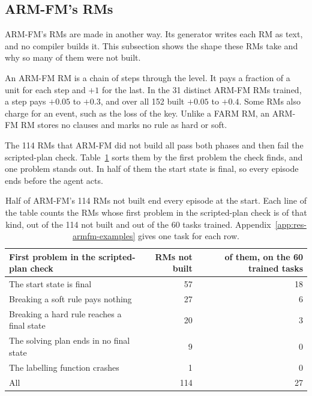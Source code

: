 \documentclass[11pt,english,listoffigures,listoftables]{tfgetsinf}
\newcommand{\gain}[1]{\textcolor{green!40!black}{\bfseries\boldmath #1}}  %
\begin{document}
\subsection{ARM-FM's RMs}
\label{sec:res-armfm-machines}

ARM-FM's RMs are made in another way. Its generator writes each RM as text, and no compiler builds it. This subsection shows the shape these RMs take and why so many of them were not built.

An ARM-FM RM is a chain of steps through the level. It pays a fraction of a unit for each step and \gain{$+1$} for the last. In the 31 distinct ARM-FM RMs trained, a step pays \gain{$+0.05$} to \gain{$+0.3$}, and over all 152 built \gain{$+0.05$} to \gain{$+0.4$}. Some RMs also charge for an event, such as the loss of the key. Unlike a FARM RM, an ARM-FM RM stores no clauses and marks no rule as hard or soft.

The 114 RMs that ARM-FM did not build all pass both phases and then fail the scripted-plan check. Table~\ref{tab:res-armfm-failures} sorts them by the first problem the check finds, and one problem stands out. In half of them the start state is final, so every episode ends before the agent acts.

\begin{table}[H]
\centering
\footnotesize
\renewcommand{\arraystretch}{1.2}
\begin{tabular}{@{}lrr@{}}
\toprule
\textbf{First problem in the scripted-plan check} & \textbf{RMs not built} & \textbf{of them, on the 60 trained tasks} \\ \midrule
The start state is final & 57 & 18 \\
Breaking a soft rule pays nothing & 27 & 6 \\
Breaking a hard rule reaches a final state & 20 & 3 \\
The solving plan ends in no final state & 9 & 0 \\
The labelling function crashes & 1 & 0 \\ \midrule
All & 114 & 27 \\ \bottomrule
\end{tabular}
\caption[Why ARM-FM's RMs were not built]{Half of ARM-FM's 114 RMs not built end every episode at the start. Each line of the table counts the RMs whose first problem in the scripted-plan check is of that kind, out of the 114 not built and out of the 60 tasks trained. Appendix~\ref{app:res-armfm-examples} gives one task for each row.}
\label{tab:res-armfm-failures}
\end{table}
\end{document}
